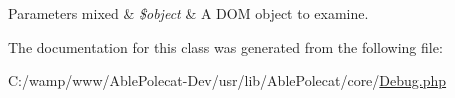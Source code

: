 \begin{DoxyParams}[1]{Parameters}
mixed & {\em \$object} & A D\+O\+M object to examine. \\
\hline
\end{DoxyParams}


The documentation for this class was generated from the following file\+:\begin{DoxyCompactItemize}
\item 
C\+:/wamp/www/\+Able\+Polecat-\/\+Dev/usr/lib/\+Able\+Polecat/core/\hyperlink{_debug_8php}{Debug.\+php}\end{DoxyCompactItemize}
